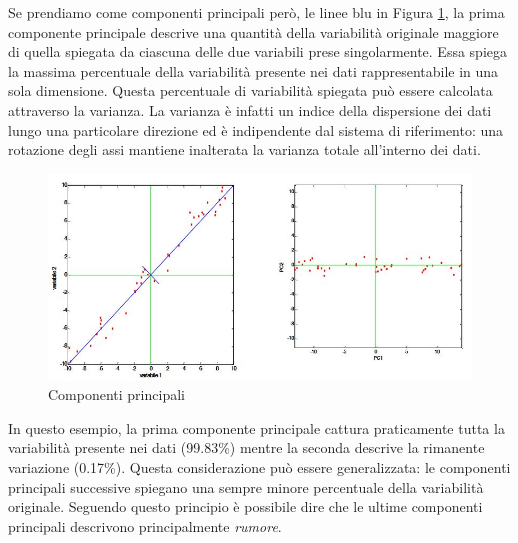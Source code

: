\documentclass[12pt]{article}
\begin{document}
		Se prendiamo come componenti principali però, le linee blu in Figura \ref{fig:componenti}, la prima componente principale descrive una quantità della variabilità originale maggiore di quella spiegata da ciascuna delle due variabili prese singolarmente. Essa spiega la massima percentuale della variabilità presente nei dati rappresentabile in una sola dimensione. Questa percentuale di variabilità spiegata può essere calcolata attraverso la varianza. La varianza è infatti un indice della dispersione dei dati lungo una particolare direzione ed è indipendente dal sistema di riferimento: una rotazione degli assi mantiene inalterata la varianza totale all’interno dei dati. 
		\begin{figure}[H]
			\begin{center}
				\includegraphics[scale=.6]{componenti}
				\caption{Componenti principali}
				\label{fig:componenti}
			\end{center}
		\end{figure}
		In questo esempio, la prima componente principale cattura praticamente tutta la variabilità presente nei dati (99.83\%) mentre la seconda descrive la rimanente variazione (0.17\%). Questa considerazione può essere generalizzata: le componenti principali successive spiegano una sempre minore percentuale della variabilità originale. Seguendo questo principio è possibile dire che le ultime componenti principali descrivono principalmente \emph{rumore}.
		
\end{document}
